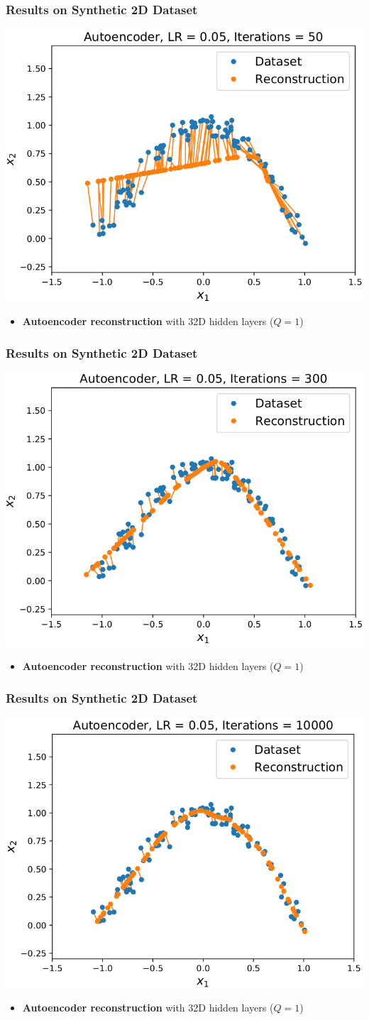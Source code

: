 \documentclass[10pt,aspectratio=169]{beamer}
\begin{document}
\begin{frame}
  \frametitle{Results on Synthetic 2D Dataset}
\begin{center}
\includegraphics[width=.5\textwidth]{images/s25}
\end{center}
\small{
\begin{itemize}
\item \textbf{Autoencoder reconstruction} with 32D hidden layers ($Q=1$)
\end{itemize}
}
\end{frame}

\begin{frame}
  \frametitle{Results on Synthetic 2D Dataset}
\begin{center}
\includegraphics[width=.5\textwidth]{images/s26}
\end{center}
\small{
\begin{itemize}
\item \textbf{Autoencoder reconstruction} with 32D hidden layers ($Q=1$)
\end{itemize}
}
\end{frame}

\begin{frame}
  \frametitle{Results on Synthetic 2D Dataset}
\begin{center}
\includegraphics[width=.5\textwidth]{images/s27}
\end{center}
\small{
\begin{itemize}
\item \textbf{Autoencoder reconstruction} with 32D hidden layers ($Q=1$)
\end{itemize}
}
\end{frame}
\end{document}

